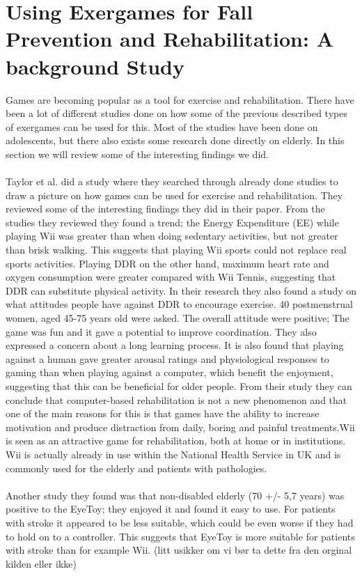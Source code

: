 \section{Using Exergames for Fall Prevention and Rehabilitation: A background Study}
Games are becoming popular as a tool for exercise and rehabilitation. There have been a lot of different studies done on how some of the previous described types of exergames can be used for this. Most of the studies have been done on adolescents, but there also exists some research done directly on elderly. In this section we will review some of the interesting findings we did.\\ \\
Taylor et al. \cite{taylor2011activity} did a study where they searched through already done studies to draw a picture on how games can be used for exercise and rehabilitation. They reviewed some of the interesting findings they did in their paper.  From the studies they reviewed they found a trend; the  Energy Expenditure (EE) while playing Wii was greater than when doing sedentary activities, but not greater than brisk walking. This suggests that playing Wii sports could not replace real sports activities. Playing DDR on the other hand, maximum heart rate and oxygen consumption were greater compared with Wii Tennis, suggesting that DDR can substitute physical activity.
In their research they also found a study on what attitudes people have against DDR to encourage exercise. 40 postmenstrual women, aged 45-75 years old were asked. The overall attitude were positive; The game was fun and it gave a potential to improve coordination. They also expressed a concern about a long learning process. It is also found that playing against a human gave greater arousal ratings and physiological responses to gaming than when playing against a computer, which benefit the enjoyment, suggesting that this can be beneficial for older people. 
From their study they can conclude that computer-based rehabilitation is not a new phenomenon and that one of the main reasons for this is that games have the ability to increase motivation and produce distraction from daily, boring and painful treatments.Wii is seen as an attractive game for rehabilitation, both at home or in institutions. Wii is actually already in use within the National Health Service in UK and is commonly used for the elderly and patients with pathologies. \cite{taylor2011activity} \\ \\
Another study they found was that non-disabled  elderly (70 +/- 5,7 years) was positive to the EyeToy; they enjoyed it and found it easy to use. For patients with stroke it appeared to be less suitable, which could be even worse if they had to hold on to a controller. This suggests that EyeToy is more suitable for patients with stroke than for example Wii.  (litt usikker om vi bør ta dette fra den orginal kilden eller ikke)
